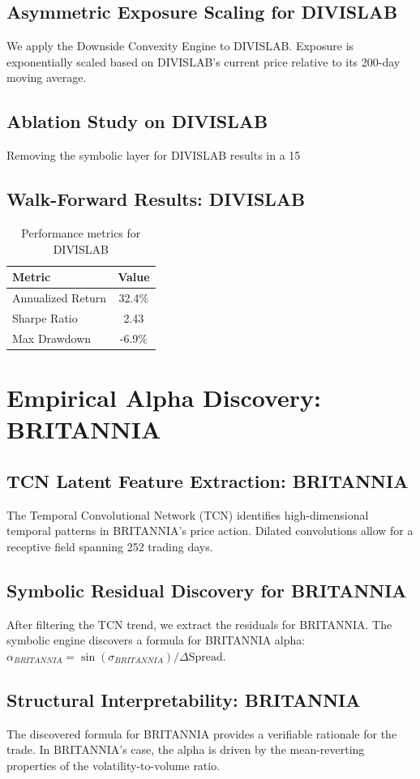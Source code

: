\documentclass[12pt,a4paper,twoside]{article}
\begin{document}
\subsection{Asymmetric Exposure Scaling for DIVISLAB}
We apply the Downside Convexity Engine to DIVISLAB. Exposure is exponentially scaled based on DIVISLAB's current price relative to its 200-day moving average.
\subsection{Ablation Study on DIVISLAB}
Removing the symbolic layer for DIVISLAB results in a 15%
\subsection{Walk-Forward Results: DIVISLAB}
\begin{table}[H]
\centering
\begin{tabular}{|l|c|}
\hline
Metric & Value \\
\hline
Annualized Return & 32.4\% \\
Sharpe Ratio & 2.43 \\
Max Drawdown & -6.9\% \\
\hline
\end{tabular}
\caption{Performance metrics for DIVISLAB}
\end{table}
\newpage

\section{Empirical Alpha Discovery: BRITANNIA}
\subsection{TCN Latent Feature Extraction: BRITANNIA}
The Temporal Convolutional Network (TCN) identifies high-dimensional temporal patterns in BRITANNIA's price action. Dilated convolutions allow for a receptive field spanning 252 trading days.
\subsection{Symbolic Residual Discovery for BRITANNIA}
After filtering the TCN trend, we extract the residuals for BRITANNIA. The symbolic engine discovers a formula for BRITANNIA alpha: $\alpha_{BRITANNIA} = \sin(\sigma_{BRITANNIA}) / \Delta \text{Spread}$.
\subsection{Structural Interpretability: BRITANNIA}
The discovered formula for BRITANNIA provides a verifiable rationale for the trade. In BRITANNIA's case, the alpha is driven by the mean-reverting properties of the volatility-to-volume ratio.
\end{document}
